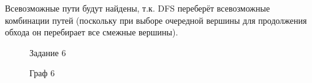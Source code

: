 \documentclass[otchet]{SCWorks}
\begin{document}
Всевозможные пути будут найдены, т.к. DFS переберёт всевозможные комбинации путей (поскольку при выборе очередной вершины для продолжения обхода он перебирает все смежные вершины).

\begin{figure}[H]
	\caption{Задание 6}
	\label{pic6_1}
\end{figure}

\begin{figure}[H]
	\caption{Граф 6}
	\label{gr6_1}
\end{figure}
\end{document}
